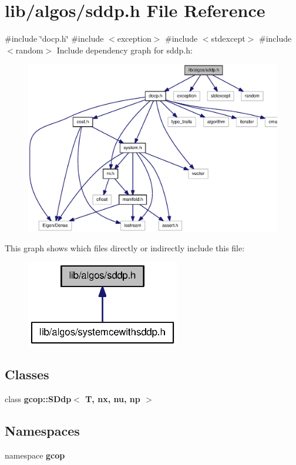 \section{lib/algos/sddp.h \-File \-Reference}
\label{sddp_8h}
{\ttfamily \#include \char`\"{}docp.\-h\char`\"{}}\*
{\ttfamily \#include $<$exception$>$}\*
{\ttfamily \#include $<$stdexcept$>$}\*
{\ttfamily \#include $<$random$>$}\*
\-Include dependency graph for sddp.\-h\-:\nopagebreak
\begin{figure}[H]
\begin{center}
\leavevmode
\includegraphics[width=350pt]{sddp_8h__incl}
\end{center}
\end{figure}
\-This graph shows which files directly or indirectly include this file\-:\nopagebreak
\begin{figure}[H]
\begin{center}
\leavevmode
\includegraphics[width=190pt]{sddp_8h__dep__incl}
\end{center}
\end{figure}
\subsection*{\-Classes}
\begin{DoxyCompactItemize}
\item 
class {\bf gcop\-::\-S\-Ddp$<$ T, nx, nu, np $>$}
\end{DoxyCompactItemize}
\subsection*{\-Namespaces}
\begin{DoxyCompactItemize}
\item 
namespace {\bf gcop}
\end{DoxyCompactItemize}
